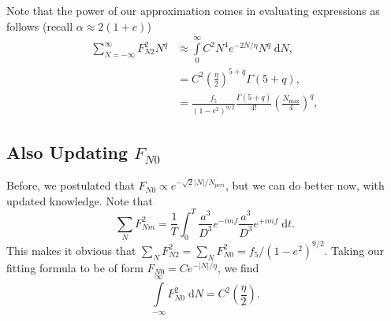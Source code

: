 \documentclass[11pt,
        usenames, %
        dvipsnames %
    ]{article}
\newcommand*{\abs}[1]{\left|#1\right|}
\newcommand*{\p}[1]{\left(#1\right)}
\begin{document}

Note that the power of our approximation comes in evaluating expressions as
follows (recall $\alpha \approx 2 (1 + e)$)
\begin{align}
    \sum\limits_{N = -\infty}^\infty F_{N2}^2 N^q
        &\approx \int\limits_0^\infty C^2 N^4 e^{-2 N / \eta}N^q
            \;\mathrm{d}N,\\
        &= C^2 \p{\frac{\eta}{2}}^{5 + q}\Gamma\p{5 + q},\\
        &= \frac{f_5}{\p{1 - e^2}^{9/2}}
            \frac{\Gamma\p{5 + q}}{4!}\p{\frac{N_{\max}}{4}}^q,
            \label{eq:fn2_swiss_army_knife}
\end{align}

\subsection{Also Updating $F_{N0}$}

Before, we postulated that $F_{N0} \propto e^{-\sqrt{2}\abs{N} / N_{peri}}$,
but we can do better now, with updated knowledge. Note that
\begin{equation}
    \sum\limits_N F_{Nm}^2 = \frac{1}{T}\int_0^T
        \frac{a^3}{D^3}e^{-imf}\frac{a^3}{D^3} e^{+imf}\;\mathrm{d}t.
\end{equation}
This makes it obvious that $\sum\limits_N F_{N2}^2 = \sum\limits_N F_{N0}^2 =
f_5 / \p{1 - e^2}^{9/2}$. Taking our fitting formula to be of form $F_{N0} =
Ce^{-\abs{N} / \eta}$, we find
\begin{equation}
    \int\limits_{-\infty}^\infty F_{N0}^2\;\mathrm{d}N
        = C^2\p{\frac{\eta}{2}}.
\end{equation}
\end{document}
